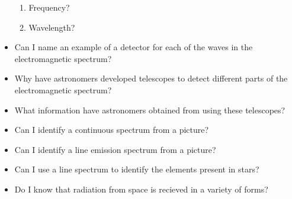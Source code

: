 \begin{multicols}{2}
\begin{itemize}
\begin{enumerate}
				\item Frequency?
				\item Wavelength?
			\end{enumerate}
		\item Can I name an example of a detector for each of the waves in the
			electromagnetic spectrum?
		\item Why have astronomers developed telescopes to detect different parts of
			the electromagnetic spectrum?
		\item What information have astronomers obtained from using these telescopes?
		\item Can I identify a continuous spectrum from a picture?
		\item Can I identify a line emission spectrum from a picture?
		\item Can I use a line spectrum to identify the elements present in stars?
		\item Do I know that radiation from space is recieved in a variety of forms?
	\end{itemize}
\end{multicols}


